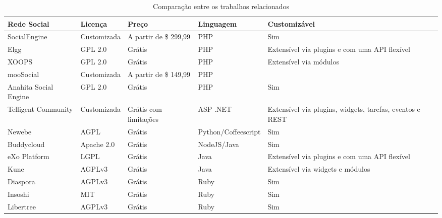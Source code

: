 \begin{table}[]
\centering
\caption{Comparação entre os trabalhos relacionados}
\label{comparacao}
\begin{adjustbox}{width=\textwidth}
\begin{tabular}{@{}llllll@{}}
\toprule
\textbf{Rede Social}  & \textbf{Licença} & \textbf{Preço}        & \textbf{Linguagem}  & \textbf{Customizável}                                    \\ \midrule
SocialEngine          & Customizada      & A partir de \$ 299,99 & PHP                 & Sim                                                      \\
Elgg                  & GPL 2.0          & Grátis                & PHP                 & Extensível via plugins e com uma API flexível            \\
XOOPS                 & GPL 2.0          & Grátis                & PHP                 & Extensível via módulos                                   \\
mooSocial             & Customizada      & A partir de \$ 149,99 & PHP                 &                                                          \\
Anahita Social Engine & GPL 2.0          & Grátis                & PHP                 & Sim                                                      \\
Telligent Community   & Customizada      & Grátis com limitações & ASP .NET            & Extensível via plugins, widgets, tarefas, eventos e REST \\
Newebe                & AGPL             & Grátis                & Python/Coffeescript & Sim                                                      \\
Buddycloud            & Apache 2.0       & Grátis                & NodeJS/Java         & Sim                                                      \\
eXo Platform          & LGPL             & Grátis                & Java                & Extensível via plugins e com uma API flexível            \\
Kune                  & AGPLv3           & Grátis                & Java                & Extensível via widgets e módulos                         \\
Diaspora              & AGPLv3           & Grátis                & Ruby                & Sim                                                      \\
Insoshi               & MIT              & Grátis                & Ruby                & Sim                                                      \\
Libertree             & AGPLv3           & Grátis                & Ruby                & Sim                                                      \\ \bottomrule
\end{tabular}
\end{adjustbox}
\end{table}

